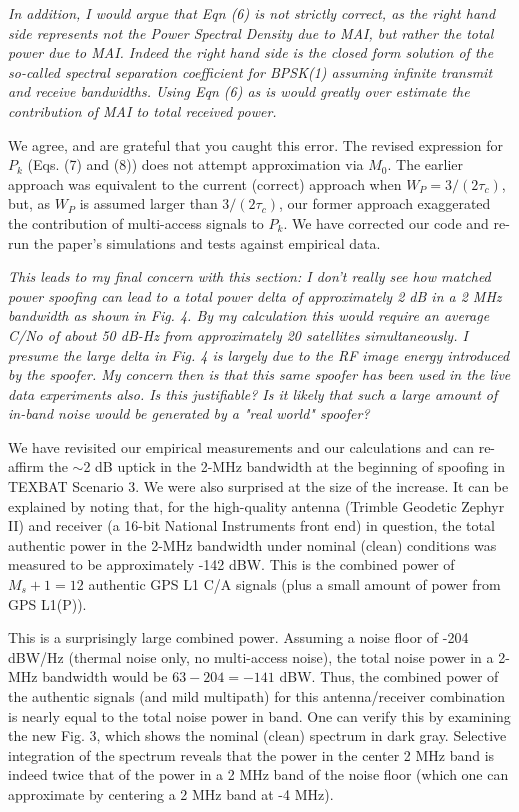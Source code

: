 \documentclass[12pt]{report}
\begin{document}
{\textit{In addition, I would argue that Eqn (6) is not strictly
      correct, as the right
hand side represents not the Power Spectral
      Density due to MAI, but rather the
total power due to MAI. Indeed the
      right hand side is the closed form solution
of the so-called spectral
      separation coefficient for BPSK(1) assuming infinite
transmit and
      receive bandwidths. Using Eqn (6) as is would greatly over
estimate the
      contribution of MAI to total received power.}}

  
  {We agree, and are grateful that you caught this error.  The revised
    expression for $P_k$ (Eqs. (7) and (8)) does not attempt approximation via
    $M_0$.  The earlier approach was equivalent to the current (correct)
    approach when $W_P = 3/(2\tau_c)$, but, as $W_P$ is assumed larger than
    $3/(2\tau_c)$, our former approach exaggerated the contribution of
    multi-access signals to $P_k$.  We have corrected our code and re-run the
    paper's simulations and tests against empirical data.}
  

{\textit{This leads to my final concern with this section: I don't really
      see how matched
power spoofing can lead to a total power delta of
      approximately 2 dB in a 2 MHz
bandwidth as shown in Fig. 4. By my
      calculation this would require an average
C/No of about 50 dB-Hz from
      approximately 20 satellites simultaneously.
I presume the large delta
      in Fig. 4 is largely due to the RF image energy
introduced by the
      spoofer. My concern then is that this same spoofer has been
used in the
      live data experiments also. Is this justifiable? Is it likely that
such
      a large amount of in-band noise would be generated by a "real world"
      spoofer?
}}
  
  We have revisited our empirical measurements and our calculations and can
  re-affirm the $\sim$2 dB uptick in the 2-MHz bandwidth at the beginning of
  spoofing in TEXBAT Scenario 3.  We were also surprised at the size of the
  increase.  It can be explained by noting that, for the high-quality antenna
  (Trimble Geodetic Zephyr II) and receiver (a 16-bit National Instruments
  front end) in question, the total authentic power in the 2-MHz bandwidth
  under nominal (clean) conditions was measured to be approximately -142 dBW.
  This is the combined power of $M_s + 1 = 12$ authentic GPS L1 C/A signals
  (plus a small amount of power from GPS L1(P)).

  This is a surprisingly large combined power.  Assuming a noise floor of -204
  dBW/Hz (thermal noise only, no multi-access noise), the total noise power in
  a 2-MHz bandwidth would be $63 - 204 = -141$ dBW.  Thus, the combined power
  of the authentic signals (and mild multipath) for this antenna/receiver
  combination is nearly equal to the total noise power in band.  One can
  verify this by examining the new Fig. 3, which shows the nominal (clean)
  spectrum in dark gray.  Selective integration of the spectrum reveals that
  the power in the center 2 MHz band is indeed twice that of the power in a 2
  MHz band of the noise floor (which one can approximate by centering a 2 MHz
  band at -4 MHz).
\end{document}
